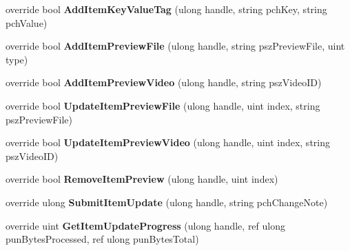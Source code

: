 \begin{DoxyCompactItemize}
override bool {\bfseries Add\+Item\+Key\+Value\+Tag} (ulong handle, string pch\+Key, string pch\+Value)
\item 
\mbox{\label{class_valve_1_1_steamworks_1_1_c_steam_u_g_c_a3c8bb216640d1e27c1bbdc6c501bd944}} 
override bool {\bfseries Add\+Item\+Preview\+File} (ulong handle, string psz\+Preview\+File, uint type)
\item 
\mbox{\label{class_valve_1_1_steamworks_1_1_c_steam_u_g_c_a707d05a3a9effefc4c47e384e7e43203}} 
override bool {\bfseries Add\+Item\+Preview\+Video} (ulong handle, string psz\+Video\+ID)
\item 
\mbox{\label{class_valve_1_1_steamworks_1_1_c_steam_u_g_c_a69b9e0a6493b6da85c99d1015099270b}} 
override bool {\bfseries Update\+Item\+Preview\+File} (ulong handle, uint index, string psz\+Preview\+File)
\item 
\mbox{\label{class_valve_1_1_steamworks_1_1_c_steam_u_g_c_ad066557d7e8d35feb2342ba605e6264d}} 
override bool {\bfseries Update\+Item\+Preview\+Video} (ulong handle, uint index, string psz\+Video\+ID)
\item 
\mbox{\label{class_valve_1_1_steamworks_1_1_c_steam_u_g_c_a907faa1880f81cc65dcbd221bcbe9d91}} 
override bool {\bfseries Remove\+Item\+Preview} (ulong handle, uint index)
\item 
\mbox{\label{class_valve_1_1_steamworks_1_1_c_steam_u_g_c_a7c604866c9e692cd21cf117fc5a57bbf}} 
override ulong {\bfseries Submit\+Item\+Update} (ulong handle, string pch\+Change\+Note)
\item 
\mbox{\label{class_valve_1_1_steamworks_1_1_c_steam_u_g_c_a0648cb8e379cc170a9c22d51c7a52bf6}} 
override uint {\bfseries Get\+Item\+Update\+Progress} (ulong handle, ref ulong pun\+Bytes\+Processed, ref ulong pun\+Bytes\+Total)
\item 
\mbox{\label{class_valve_1_1_steamworks_1_1_c_steam_u_g_c_a6a100f0812c1d10493f9ba30f0701c08}} 

\end{DoxyCompactItemize}
